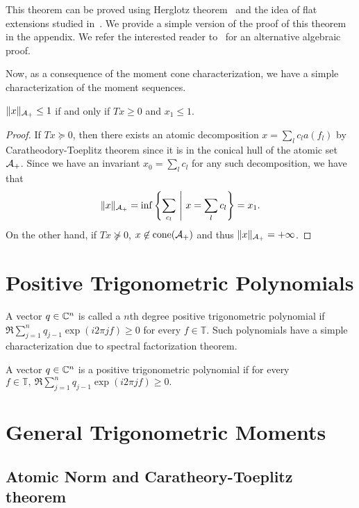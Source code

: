 This theorem can be proved using Herglotz theorem~\cite{herglotz} and the idea
of flat extensions studied in~\cite{Curto97}. We provide a simple version of the
proof of this theorem in the appendix. We refer the
interested reader to~\cite{grenander01} for an alternative algebraic proof.

Now, as a consequence of the moment cone characterization, we have a simple characterization of the moment sequences. 

\begin{theorem}
	$\lVert x\rVert_{\mathcal{A}_{+}} \leq 1$ if and only if $T x \geq 0$ and $x_1 \leq 1$.
\end{theorem}
\begin{proof}
If $T x \succeq 0$, then there exists an atomic decomposition $x = \sum_l c_l a(f_l)$ by Caratheodory-Toeplitz theorem since it is in the conical hull of the atomic set $\mathcal{A}_+$. Since we have an invariant $x_0 = \sum_l c_l$ for any such decomposition, we have that
\[
\lVert x\rVert_{\mathcal{A}_{+}}  = \inf\left\{ \sum_{c_l} ~\middle|~ x = \sum_l c_l \right\} = x_1.
\]
On the other hand, if $Tx \not\succeq 0$, $x \not\in \operatorname{cone}(\mathcal{A}_+)$ and thus $\lVert x\rVert_{\mathcal{A}_{+}} = +\infty$.
\end{proof}

\section{Positive Trigonometric Polynomials}

A vector $q \in \mathbb{C}^n$ is called a $n$th degree positive trigonometric polynomial
if $\Re\sum_{j=1}^{n} q_{j-1} \exp(i2\pi j f) \geq 0$ for every $f \in
\mathbb{T}.$ Such polynomials have a simple characterization due to spectral
factorization theorem.

\begin{definition}
A vector $q \in \mathbb{C}^n$ is a positive trigonometric polynomial if
for every $f \in \mathbb{T},~ \Re\sum_{j=1}^{n} q_{j-1} \exp(i2\pi j f) \geq 0.$
\end{definition}

\section{General Trigonometric Moments}
\subsection{Atomic Norm and Caratheory-Toeplitz theorem}
